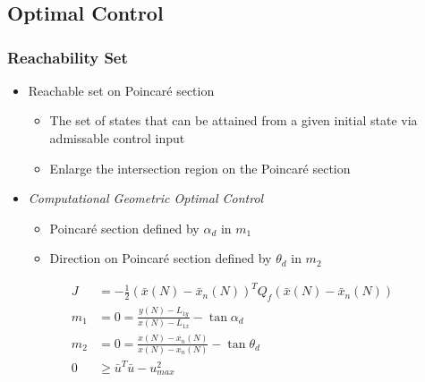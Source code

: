 \section*{}
\subsection*{Optimal Control}
\begin{frame} %
\frametitle{Reachability Set}
  \begin{itemize}
  \item Reachable set on Poincar\'e section
  		\begin{itemize}
  			\item The set of states that can be attained from a given initial state via admissable control input
  			\item Enlarge the intersection region on the Poincar\'e section
  		\end{itemize}
  \item \emph{Computational Geometric Optimal Control}
	\begin{itemize}
  		\item Poincar\'e section defined by \( \alpha_d \) in \( m_1\)
		\item Direction on Poincar\'e section defined by \( \theta_d \) in \( m_2 \)
	\end{itemize}
 \end{itemize}
  \begin{align*}
	J &= -\frac{1}{2} \left( \bar{x}(N) - \bar{x}_{n}(N)\right)^T Q_f\left( \bar{x}(N) - \bar{x}_{n}(N)\right)\\
	m_1 &= 0 = \frac{y(N) - L_{1y}}{x(N) - L_{1x}} - \tan{\alpha_d} \\ 
    m_2&= 0 = \frac{\dot{x}(N) - \dot{x_n}(N) }{x(N) -x_n(N) } - \tan{\theta_d} \\
	 0 &\geq\bar{u}^T \bar{u} - u_{max}^2 
	\end{align*}

\end{frame}   %


